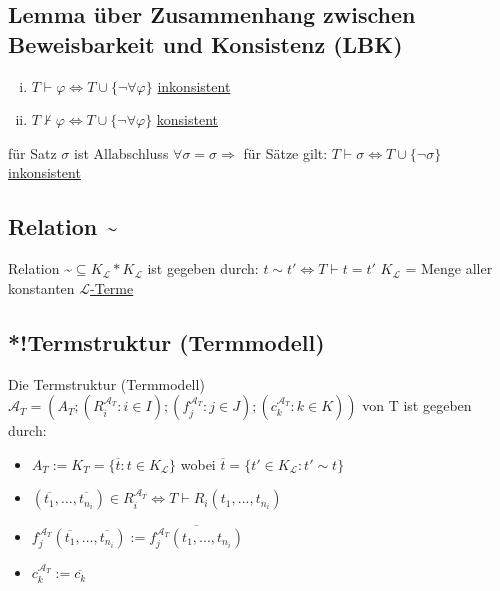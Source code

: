 \documentclass[12pt,a4paper]{article} %
\begin{document}
	\subsection{Lemma über Zusammenhang zwischen Beweisbarkeit und Konsistenz (LBK)}
	\begin{enumerate}[(i)]
		\item $T \hyperref[Beweisbar]{\vdash} \varphi \Leftrightarrow T \cup \{\neg \forall \varphi\}$ \hyperref[PLKonsistent]{inkonsistent}
		\item $T \nvdash \varphi \Leftrightarrow T \cup \{\neg \forall \varphi\}$ \hyperref[PLKonsistent]{konsistent}
	\end{enumerate}
	für Satz $\sigma$ ist Allabschluss $\forall \sigma = \sigma \Rightarrow$ für Sätze gilt: $T \hyperref[Beweisbar]{\vdash} \sigma \Leftrightarrow T \cup \{\neg \sigma\}$ \hyperref[PLKonsistent]{inkonsistent}
	
	\subsection{Relation \textasciitilde}
	Relation \textasciitilde $\subseteq K_{\mathcal{L}} * K_{\mathcal{L}}$ ist gegeben durch: $ t \sim t' \Leftrightarrow T \hyperref[Beweisbar]{\vdash} t = t'$ \newline
	$K_{\mathcal{L}}$ = Menge aller konstanten \hyperref[Term]{$\mathcal{L}$-Terme}
	
	\subsection{*!Termstruktur (Termmodell)}
	Die Termstruktur (Termmodell) $\mathcal{A}_T = (A_T; (R_i^{\mathcal{A}_T}: i \in I); (f_j^{\mathcal{A}_T}: j \in J); (c_k^{\mathcal{A}_T}: k \in K))$ von T ist gegeben durch: 
	\begin{itemize}
		\item $A_T := K_T = \{\overline{t}: t \in K_{\mathcal{L}}\}$ wobei $\overline{t} = \{t' \in K_{\mathcal{L}}: t' \sim t\}$
		\item $(\overline{t_1}, ..., \overline{t_{n_i}}) \in R_i^{\mathcal{A}_T} \Leftrightarrow T \hyperref[Beweisbar]{\vdash} R_i(t_1, ..., t_{n_i})$
		\item $f_j^{\mathcal{A}_T}(\overline{t_1}, ..., \overline{t_{n_i}}) := \overline{f_j^{\mathcal{A}_T}(t_1, ..., t_{n_i})}$
		\item $c_k^{\mathcal{A}_T} := \overline{c_k}$
	\end{itemize}
\end{document}
